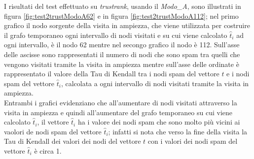 I risultati del test effettuato su \textit{trustrank}, usando il \textit{Modo\_A}, sono illustrati in figura \ref{fig:test2trustModoA62} e in figura \ref{fig:test2trustModoA112}; nel primo grafico il nodo sorgente della visita in ampiezza, che viene utilizzata per costruire il grafo temporaneo ogni intervallo di nodi visitati e su cui viene calcolato \(\hat{t}_i\) ad ogni intervallo, è il nodo 62 mentre nel secongo grafico il nodo è 112.  Sull'asse delle ascisse sono rappresentati il numero di nodi che sono spam tra quelli che vengono visitati tramite la visita in ampiezza mentre sull'asse delle ordinate è rappresentato il valore della Tau di Kendall tra i nodi spam del vettore \(t\) e i nodi spam del vettore \(\hat{t}_i\), calcolata a ogni intervallo di nodi visitati tramite la visita in ampiezza.\\
Entrambi i grafici evidenziano che all'aumentare di nodi visitati attraverso la visita in ampiezza e quindi all'aumentare del grafo temporaneo su cui viene calcolato \(\hat{t}_i\), il vettore \(\hat{t}_i\) ha i valore dei nodi spam che sono molto più vicini ai vaolori de nodi spam del vettore \(\hat{t}_i\); infatti si nota che verso la fine della visita la Tau di Kendall dei valori dei nodi del vettore \(t\) con i valori dei nodi spam del vettore \(\hat{t}_i\) è circa 1. 

